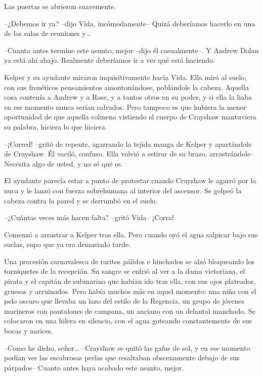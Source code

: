 {Las puertas se abrieron suavemente.}

{--¿Debemos ir ya? --dijo Vida, incómodamente-- Quizá deberíamos hacerlo
 en una de las salas de reuniones y\ldots{}}

{--Cuanto antes termine este asunto, mejor --dijo él casualmente--. Y
 Andrew Dolan ya está ahí abajo. Realmente deberíamos ir a ver qué está
haciendo.}

{Kelper y su ayudante miraron inquisitivamente hacia Vida. Ella miró al
 suelo, con sus frenéticos pensamientos amontonándose, poblándole la
 cabeza. Aquella cosa contenía a Andrew y a Rose, y a tantos otros en su
 poder, y si ella la liaba en ese momento nunca serían salvados. Pero
 tampoco es que hubiera la menor oportunidad de que aquella colmena
 vistiendo el cuerpo de Crayshaw mantuviera su palabra, hiciera lo que
hiciera.}

{--¡Corred! --gritó de repente, agarrando la tejida manga de Kelper y
 apartándole de Crayshaw. Él vaciló, confuso. Ella volvió a estirar de su
brazo, arrastrándole-- Necesita algo de usted, y no sé qué es.}

{El ayudante parecía estar a punto de protestar cuando Crayshaw le
 agarró por la nuca y le lanzó con fuerza sobrehumana al interior del
 ascensor. Se golpeó la cabeza contra la pared y se derrumbó en el
suelo.}

{--¿Cuántas veces más hacen falta? --gritó Vida-- ¡Corra!}

{Comenzó a arrastrar a Kelper tras ella. Pero cuando oyó el agua
salpicar bajo sus suelas, supo que ya era demasiado tarde.}

{Una procesión carnavalesca de raritos pálidos e hinchados se alzó
 bloqueando los torniquetes de la recepción. Su sangre se enfrió al ver a
 la dama victoriana, el pirata y el capitán de submarino que habían ido
 tras ella, con sus ojos plateados, gruesos y arruinados. Pero había
 muchos más en aquel momento: una niña con el pelo oscuro que llevaba un
 lazo del estilo de la Regencia, un grupo de jóvenes marineros con
 pantalones de campana, un anciano con un delantal manchado. Se colocaron
 en una hilera en silencio, con el agua goteando constantemente de sus
bocas y narices.}

{--Como he dicho, señor\ldots{} --Crayshaw se quitó las gafas de sol, y
 en ese momento podían ver las escabrosas perlas que resaltaban
 obscenamente debajo de sus párpados-- Cuanto antes haya acabado este
asunto, mejor.}

\mbox{}

